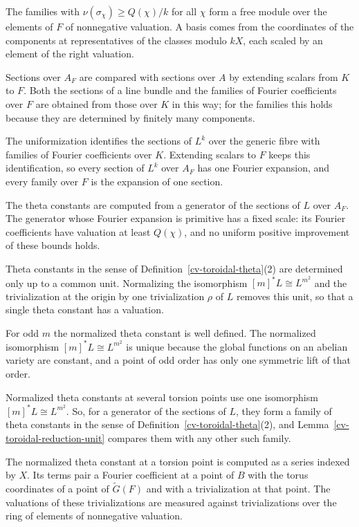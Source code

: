 The families with $\nu(\sigma_\chi)\ge Q(\chi)/k$ for all $\chi$ form a free module over the elements of $F$
of nonnegative valuation. A basis comes from the coordinates of the components at representatives of the
classes modulo $kX$, each scaled by an element of the right valuation.

Sections over $A_F$ are compared with sections over $A$ by extending scalars from $K$ to $F$. Both the
sections of a line bundle and the families of Fourier coefficients over $F$ are obtained from those over $K$
in this way; for the families this holds because they are determined by finitely many components.

The uniformization identifies the sections of $L^k$ over the generic fibre with families of Fourier
coefficients over $K$. Extending scalars to $F$ keeps this identification, so every section of $L^k$ over
$A_F$ has one Fourier expansion, and every family over $F$ is the expansion of one section.

The theta constants are computed from a generator of the sections of $L$ over $A_F$. The generator whose
Fourier expansion is primitive has a fixed scale: its Fourier coefficients have valuation at least
$Q(\chi)$, and no uniform positive improvement of these bounds holds.

Theta constants in the sense of Definition~\ref{cv-toroidal-theta}(2) are determined only up to a common
unit. Normalizing the isomorphism $[m]^*L\cong L^{m^2}$ and the trivialization at the origin by one
trivialization $\rho$ of $L$ removes this unit, so that a single theta constant has a valuation.

For odd $m$ the normalized theta constant is well defined. The normalized isomorphism
$[m]^*L\cong L^{m^2}$ is unique because the global functions on an abelian variety are constant, and a
point of odd order has only one symmetric lift of that order.

Normalized theta constants at several torsion points use one isomorphism $[m]^*L\cong L^{m^2}$. So, for a
generator of the sections of $L$, they form a family of theta constants in the sense of
Definition~\ref{cv-toroidal-theta}(2), and Lemma~\ref{cv-toroidal-reduction-unit} compares them with any
other such family.

The normalized theta constant at a torsion point is computed as a series indexed by $X$. Its terms pair a
Fourier coefficient at a point of $B$ with the torus coordinates of a point of $\tilde G(F)$ and with a
trivialization at that point. The valuations of these trivializations are measured against trivializations
over the ring of elements of nonnegative valuation.

